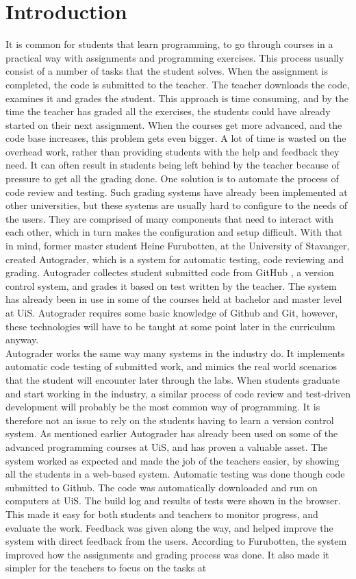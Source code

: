 \chapter*{Introduction}
It is common for students that learn programming, to go through courses in a practical way with assignments and programming exercises. This process usually consist of a number of tasks that the student solves. When the assignment is completed, the code is submitted to the teacher. The teacher downloads the code, examines it and grades the student. This approach is time consuming, and by the time the teacher has graded all the exercises, the students could have already started on their next assignment. When the courses get more advanced, and the code base increases, this problem gets even bigger. A lot of time is wasted on the overhead work, rather than providing students with the help and feedback they need. It can often result in students being left behind by the teacher because of pressure to get all the grading done. One solution is to automate the process of code review and testing. Such grading systems have already been implemented at other universities, but these systems are usually hard to configure to the needs of the users. They are comprised of many components that need to interact with each other, which in turn makes the configuration and setup difficult. With that in mind, former master student Heine Furubotten, at the University of Stavanger, created Autograder, which is a system for automatic testing, code reviewing and grading. Autograder collectes student submitted code from GitHub \cite{githubhome}, a version control system, and grades it based on test written by the teacher. The system has already been in use in some of the courses held at bachelor and master level at UiS. Autograder requires some basic knowledge of Github and Git, however, these technologies will have to be taught at some point later in the curriculum anyway. \\Autograder works the same way many systems in the industry do. It implements automatic code testing of submitted work, and mimics the real world scenarios that the student will encounter later through the labs. When students graduate and start working in the industry, a similar process of code review and test-driven development will probably be the most common way of programming. It is therefore not an issue to rely on the students having to learn a version control system. As mentioned earlier Autograder has already been used on some of the advanced programming courses at UiS, and has proven a valuable asset. The system worked as expected and made the job of the teachers easier, by showing all the students in a web-based system. Automatic testing was done though code submitted to Github. The code was automatically downloaded and run on computers at UiS. The build log and results of tests were shown in the  browser. This made it easy for both students and teachers to monitor progress, and evaluate the work. Feedback was given along the way, and helped improve the system with direct feedback from the users. According to Furubotten, the system improved how the assignments and grading process was done. It also made it simpler for the teachers to focus on the tasks at 